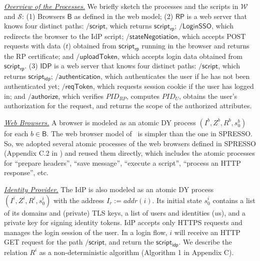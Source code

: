 \vspace{1mm}\noindent \underline{\em Overview of the Processes.} We briefly sketch the processes and the scripts in $\mathcal{W}$ and $\mathcal{S}$: 
(1) Browsers $\mathsf{B}$ as defined in the web model; 
(2) $\mathsf{RP}$ is a web server that knows four distinct paths: $\mathsf{/script}$, which returns $\mathsf{script_{rp}}$; $\mathsf{/LoginSSO}$, which redirects the browser to the IdP script; $\mathsf{/stateNegotiation}$, which accepts POST requests with data ($t$) obtained from $\mathsf{script_{rp}}$ running in the browser and returns the RP certificate; and $\mathsf{/uploadToken}$, which accepts login data obtained from $\mathsf{script_{rp}}$. 
(3) $\mathsf{IDP}$ is a web server that knows four distinct paths: $\mathsf{/script}$, which returns $\mathsf{script_{idp}}$; $\mathsf{/authentication}$, which authenticates the user if he has not been authenticated yet; $\mathsf{/reqToken}$, which requests session cookie if the user has logged in; and $\mathsf{/authorize}$, which verifies $PID_{RP}$, computes $PID_U$, obtains the user's authorization for the request, and returns the scope of the authorized attributes. %

\vspace{1mm}\noindent \underline{\em Web Browsers.} A browser is modeled as an atomic DY process $(I^b, Z^b, R^b, s_0^b)$ for each $b \in \mathsf{B}$. The web browser model of \usso\ is simpler than the one in SPRESSO. So, we adopted several atomic processes of the web browsers defined in SPRESSO (Appendix C.2 in \cite{SPRESSO}) and reused them directly, which includes the atomic processes for ``prepare headers'', ``save message'', ``execute a script'', ``process an HTTP response'', etc. 

\vspace{1mm}\noindent \underline{\em Identity Provider.} The IdP is also modeled as an atomic DY process $(I^i, Z^i, R^i, s_0^i)$ with the address $I_r:=addr(i)$. Its initial state $s_0^i$ contains a list of its domains and (private) TLS keys, a list of users and identities ($u$s), and a private key
for signing identity tokens. IdP accepts only HTTPS requests and manages the login session of the user. In a login flow, $i$ will receive an HTTP GET request for the path $\mathsf{/script}$, and return the $\mathsf{script_{idp}}$. We describe the relation $R^i$ as a non-deterministic algorithm (Algorithm 1 in Appendix C). 

